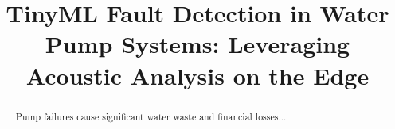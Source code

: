 \documentclass[conference]{IEEEtran}
\begin{document}
\title{TinyML Fault Detection in Water Pump Systems: Leveraging Acoustic Analysis on the Edge}

\author{
} 

\maketitle

\begin{abstract} 
Pump failures cause significant water waste and financial losses...
\end{abstract}








\end{document}
